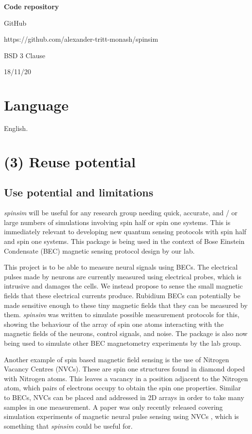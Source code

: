 \documentclass{jors}
\begin{document}
{\bf Code repository}

\begin{description}[noitemsep,topsep=0pt]
	\item[Name:] GitHub
	\item[Persistent identifier:] https://github.com/alexander-tritt-monash/spinsim
	\item[Licence:] BSD 3 Clause
	\item[Date published:] 18/11/20
\end{description}

\section{Language}

English.

\section{(3) Reuse potential}

	\subsection{Use potential and limitations}
		\emph{spinsim} will be useful for any research group needing quick, accurate, and / or large numbers of simulations involving spin half or spin one systems.
		This is immediately relevant to developing new quantum sensing protocols with spin half and spin one systems.
		This package is being used in the context of Bose Einstein Condensate (BEC) magnetic sensing protocol design by our lab.

		This project is to be able to measure neural signals using BECs.
		The electrical pulses made by neurons are currently measured using electrical probes, which is intrusive and damages the cells.
		We instead propose to sense the small magnetic fields that these electrical currents produce.
		Rubidium BECs can potentially be made sensitive enough to these tiny magnetic fields that they can be measured by them.
		\emph{spinsim} was written to simulate possible measurement protocols for this, showing the behaviour of the array of spin one atoms interacting with the magnetic fields of the neurons, control signals, and noise.
		The package is also now being used to simulate other BEC magnetometry experiments by the lab group.

		Another example of spin based magnetic field sensing is the use of Nitrogen Vacancy Centres (NVCs).
		These are spin one structures found in diamond doped with Nitrogen atoms.
		This leaves a vacancy in a position adjacent to the Nitrogen atom, which pairs of electrons occupy to obtain the spin one properties.
		Similar to BECs, NVCs can be placed and addressed in 2D arrays in order to take many samples in one measurement.
		A paper was only recently released covering simulation experiments of magnetic neural pulse sensing using NVCs \cite{parashar_axon_2020}, which is something that \emph{spinsim} could be useful for.
\end{document}
